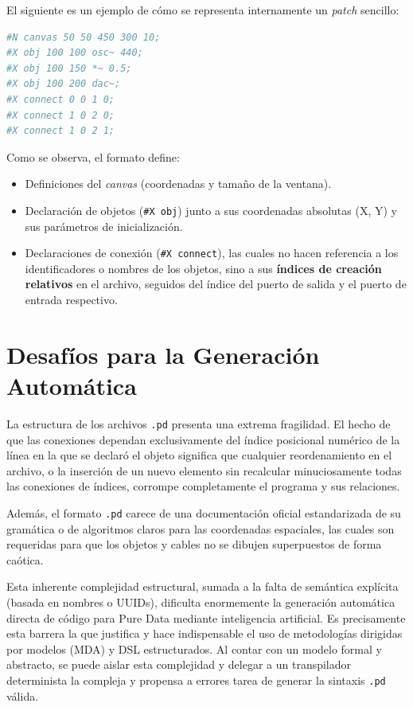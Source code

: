 El siguiente es un ejemplo de cómo se representa internamente un \textit{patch} sencillo:

\begin{lstlisting}[language=bash, caption={Contenido en texto plano de un archivo \texttt{.pd}.}]
#N canvas 50 50 450 300 10;
#X obj 100 100 osc~ 440;
#X obj 100 150 *~ 0.5;
#X obj 100 200 dac~;
#X connect 0 0 1 0;
#X connect 1 0 2 0;
#X connect 1 0 2 1;
\end{lstlisting}

Como se observa, el formato define:
\begin{itemize}
    \item Definiciones del \textit{canvas} (coordenadas y tamaño de la ventana).
    \item Declaración de objetos (\verb|#X obj|) junto a sus coordenadas absolutas (X, Y) y sus parámetros de inicialización.
    \item Declaraciones de conexión (\verb|#X connect|), las cuales no hacen referencia a los identificadores o nombres de los objetos, sino a sus \textbf{índices de creación relativos} en el archivo, seguidos del índice del puerto de salida y el puerto de entrada respectivo.
\end{itemize}

\section{Desafíos para la Generación Automática}

La estructura de los archivos \texttt{.pd} presenta una extrema fragilidad. El hecho de que las conexiones dependan exclusivamente del índice posicional numérico de la línea en la que se declaró el objeto significa que cualquier reordenamiento en el archivo, o la inserción de un nuevo elemento sin recalcular minuciosamente todas las conexiones de índices, corrompe completamente el programa y sus relaciones.

Además, el formato \texttt{.pd} carece de una documentación oficial estandarizada de su gramática o de algoritmos claros para las coordenadas espaciales, las cuales son requeridas para que los objetos y cables no se dibujen superpuestos de forma caótica.

Esta inherente complejidad estructural, sumada a la falta de semántica explícita (basada en nombres o UUIDs), dificulta enormemente la generación automática directa de código para Pure Data mediante inteligencia artificial. Es precisamente esta barrera la que justifica y hace indispensable el uso de metodologías dirigidas por modelos (MDA) y DSL estructurados. Al contar con un modelo formal y abstracto, se puede aislar esta complejidad y delegar a un transpilador determinista la compleja y propensa a errores tarea de generar la sintaxis \texttt{.pd} válida.
